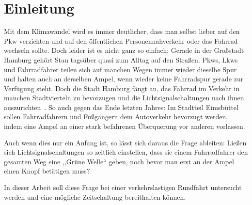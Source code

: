 %
\chapter{Einleitung}\label{ch:einleitung}

Mit dem Klimawandel wird es immer deutlicher, dass man selbst lieber auf den Pkw verzichten und auf den öffentlichen Personennahverkehr oder das Fahrrad wechseln sollte.
Doch leider ist es nicht ganz so einfach: Gerade in der Großstadt Hamburg gehört Stau tagsüber quasi zum Alltag auf den Straßen.
Pkws, Lkws und Fahrradfahrer teilen sich auf manchen Wegen immer wieder dieselbe Spur und halten auch an derselben Ampel, wenn wieder keine Fahrradspur gerade zur Verfügung steht.
Doch die Stadt Hamburg fängt an, das Fahrrad im Verkehr in manchen Stadtvierteln zu bevorzugen und die Lichtsignalschaltungen nach ihnen auszurichten~\cite{NDR2022}.
So auch gegen das Ende letzten Jahres: Im Stadtteil Eimsbüttel sollen Fahrradfahrern und Fußgängern dem Autoverkehr bevorzugt werden, indem eine Ampel an einer stark befahrenen Überquerung vor anderen vorlassen.

Auch wenn dies nur ein Anfang ist, so lässt sich daraus die Frage ableiten: Ließen sich Lichtsignalschaltungen so zeitlich einstellen, dass sie einem Fahrradfahrer den gesamten Weg eine ,,Grüne Welle`` geben, noch bevor man erst an der Ampel einen Knopf betätigen muss?

In dieser Arbeit soll diese Frage bei einer verkehrslastigen Rundfahrt untersucht werden und eine mögliche Zeitschaltung bereithalten können.




